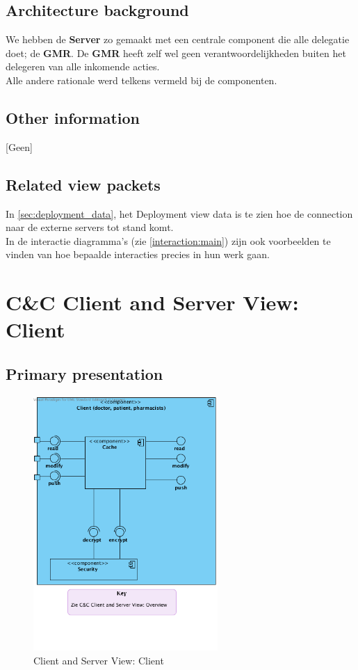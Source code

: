 \documentclass[a4paper,10pt]{article}
\begin{document}
\subsection{Architecture background}
We hebben de \textbf{Server} zo gemaakt met een centrale component die alle delegatie doet; de \textbf{GMR}.  De \textbf{GMR} heeft zelf wel geen verantwoordelijkheden buiten het delegeren van alle inkomende acties.\\
Alle andere rationale werd telkens vermeld bij de componenten.

\subsection{Other information}
[Geen]

\subsection{Related view packets}
In \ref{sec:deployment_data}, het Deployment view data is te zien hoe de connection naar de externe servers tot stand komt.\\
In de interactie diagramma's (zie \ref{interaction:main}) zijn ook voorbeelden te vinden van hoe bepaalde interacties precies in hun werk gaan.


\clearpage
\section{C\&C Client and Server View: Client}
\label{Client and Server View: Client}

\subsection{Primary presentation}

\begin{figure}[!h]
  \includegraphics[width=70mm]{../images/ClientServer_Client.png}
  \caption{Client and Server View: Client}
\end{figure}
\end{document}
